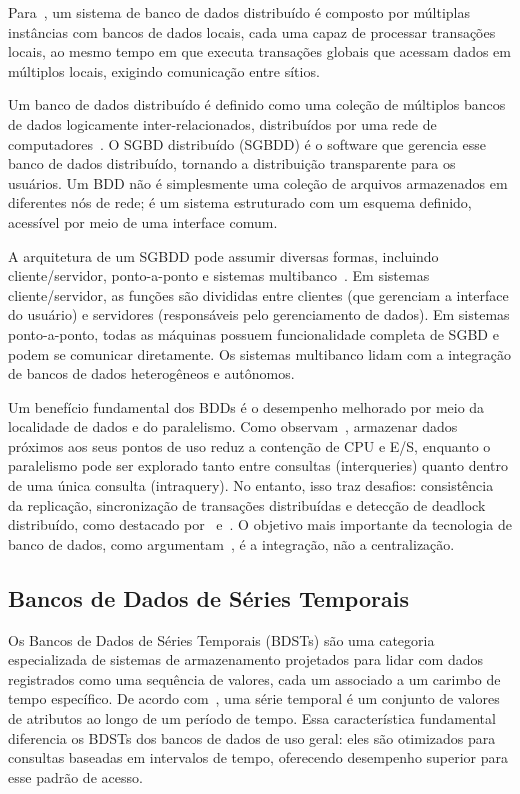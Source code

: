Para~\cite{Silberschatz2020}, um sistema de banco de dados distribuído é composto por múltiplas
instâncias com bancos de dados locais, cada uma capaz de processar transações locais, ao mesmo
tempo em que executa transações globais que acessam dados em múltiplos locais, exigindo
comunicação entre sítios.

Um banco de dados distribuído é definido como uma coleção de múltiplos bancos de dados
logicamente inter-relacionados, distribuídos por uma rede de computadores~\cite{Ozsu2011}.
O SGBD distribuído (SGBDD) é o software que gerencia esse banco de dados distribuído, tornando
a distribuição transparente para os usuários. Um BDD não é simplesmente uma coleção de arquivos
armazenados em diferentes nós de rede; é um sistema estruturado com um esquema definido,
acessível por meio de uma interface comum.

A arquitetura de um SGBDD pode assumir diversas formas, incluindo cliente/servidor,
ponto-a-ponto e sistemas multibanco~\cite{Ozsu2011}. Em sistemas cliente/servidor, as funções
são divididas entre clientes (que gerenciam a interface do usuário) e servidores (responsáveis
pelo gerenciamento de dados). Em sistemas ponto-a-ponto, todas as máquinas possuem
funcionalidade completa de SGBD e podem se comunicar diretamente. Os sistemas multibanco lidam
com a integração de bancos de dados heterogêneos e autônomos.

Um benefício fundamental dos BDDs é o desempenho melhorado por meio da localidade de dados e
do paralelismo. Como observam~\cite{Ozsu2011}, armazenar dados próximos aos seus pontos de uso
reduz a contenção de CPU e E/S, enquanto o paralelismo pode ser explorado tanto entre consultas
(interqueries) quanto dentro de uma única consulta (intraquery). No entanto, isso traz desafios:
consistência da replicação, sincronização de transações distribuídas e detecção de deadlock
distribuído, como destacado por~\cite{Ozsu2011} e~\cite{Silberschatz2020}. O objetivo mais
importante da tecnologia de banco de dados, como argumentam~\cite{Ozsu2011}, é a integração,
não a centralização.

\subsection{Bancos de Dados de Séries Temporais}
\label{sec:tsdb-theory}

Os Bancos de Dados de Séries Temporais (BDSTs) são uma categoria especializada de sistemas
de armazenamento projetados para lidar com dados registrados como uma sequência de valores,
cada um associado a um carimbo de tempo específico. De acordo com~\cite{Ozsu2011}, uma série
temporal é um conjunto de valores de atributos ao longo de um período de tempo. Essa
característica fundamental diferencia os BDSTs dos bancos de dados de uso geral: eles são
otimizados para consultas baseadas em intervalos de tempo, oferecendo desempenho superior para
esse padrão de acesso.

